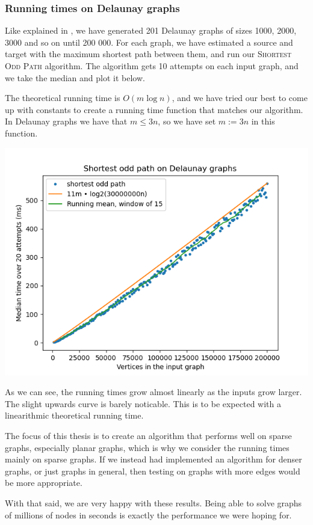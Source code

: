 \subsubsection{Running times on Delaunay graphs}
\label{subsubsection:odd-path-delaunay-testing}
Like explained in , we have generated 201 Delaunay graphs of sizes 1000, 2000, 3000 and so on until 200 000. For each graph, we have estimated a source and target with the maximum shortest path between them, and run our \textsc{Shortest Odd Path} algorithm. The algorithm gets 10 attempts on each input graph, and we take the median and plot it below.

The theoretical running time is $O(m \log n)$, and we have tried our best to come up with constants to create a running time function that matches our algorithm. In Delaunay graphs we have that $m \leq 3n$, so we have set $m := 3n$ in this function.

\includegraphics[width=15cm]{figures/bench_plots/shortest odd path.png}


As we can see, the running times grow almost linearly as the inputs grow larger. The slight upwards curve is barely noticable. This is to be expected with a linearithmic theoretical running time.

The focus of this thesis is to create an algorithm that performs well on sparse graphs, especially planar graphs, which is why we consider the running times mainly on sparse graphs. If we instead had implemented an algorithm for denser graphs, or just graphs in general, then testing on graphs with more edges would be more appropriate.

With that said, we are very happy with these results.  Being able to solve graphs of millions of nodes in seconds is exactly the performance we were hoping for.
